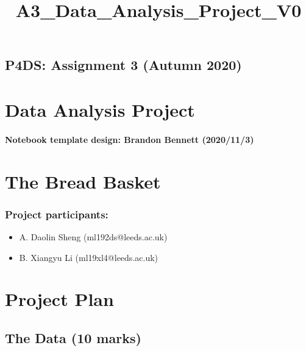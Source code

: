 \documentclass[11pt]{article}
\title{A3\_Data\_Analysis\_Project\_V0}
\providecommand{\tightlist}{%
      \setlength{\itemsep}{0pt}\setlength{\parskip}{0pt}}
\begin{document}
    
    \maketitle
    
    

    
    \hypertarget{p4ds-assignment-3-autumn-2020}{%
\subsection{P4DS: Assignment 3 (Autumn
2020)}\label{p4ds-assignment-3-autumn-2020}}

\hypertarget{data-analysis-project}{%
\section{Data Analysis Project}\label{data-analysis-project}}

\hypertarget{notebook-template-design-brandon-bennett-2020113}{%
\paragraph{Notebook template design: Brandon Bennett
(2020/11/3)}\label{notebook-template-design-brandon-bennett-2020113}}

\hypertarget{the-bread-basket}{%
\section{The Bread Basket}\label{the-bread-basket}}

\hypertarget{project-participants}{%
\subsubsection{Project participants:}\label{project-participants}}

\begin{itemize}
\tightlist
\item
  A. Daolin Sheng (ml192ds@leeds.ac.uk)
\item
  B. Xiangyu Li (ml19xl4@leeds.ac.uk)
\end{itemize}

    \hypertarget{project-plan}{%
\section{Project Plan}\label{project-plan}}

\hypertarget{the-data-10-marks}{%
\subsection{The Data (10 marks)}\label{the-data-10-marks}}
\end{document}
